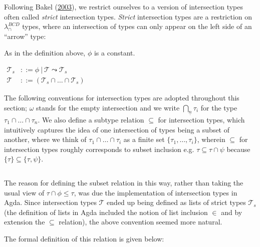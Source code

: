 \documentclass[a4paper, 12pt, twoside]{style/ociamthesis}
\theoremstyle{plain}
\theoremstyle{definition}
\newtheorem{Definition}{Definition}[chapter]
\theoremstyle{remark}
\newtheorem*{Remark}{Remark}
\newcommand{\taui}{\bigcap\nolimits_{\underline{n}} \tau_i}
\renewenvironment{Remark}{\begin{OldRemark}\begin{mdframed}[style=example, linecolor=black]}{\end{mdframed}\end{OldRemark}}
\renewenvironment{Definition}{\begin{OldDefinition}\begin{mdframed}[style=example, linecolor=cyan]}{\end{mdframed}\end{OldDefinition}}
\begin{document}
Following Bakel (\protect\hyperlink{ref-bakel}{2003}), we restrict
ourselves to a version of intersection types often called \emph{strict}
intersection types. \emph{Strict} intersection types are a restriction
on \(\lambda_\cap^{BCD}\) types, where an intersection of types can only
appear on the left side of an ``arrow'' type:

\begin{Definition}[Strict intersection types]

\label{Definition:itypes} As in the definition above, \(\phi\) is a
constant.

\begin{center}
$\begin{aligned}
\mathcal{T}_s &::= \phi\ |\ \mathcal{T} \leadsto \mathcal{T}_s \\ 
\mathcal{T} &::= (\mathcal{T}_s \cap\hdots\cap \mathcal{T}_s)
\end{aligned}$
\end{center}

\end{Definition}

The following conventions for intersection types are adopted throughout
this section; \(\omega\) stands for the empty intersection and we write
\(\taui\) for the type \(\tau_1 \cap\hdots\cap \tau_n\). We also define
a subtype relation \(\subseteq\) for intersection types, which
intuitively captures the idea of one intersection of types being a
subset of another, where we think of \(\tau_1 \cap \hdots \cap \tau_i\)
as a finite set \(\{\tau_1, \hdots , \tau_i\}\), wherein \(\subseteq\)
for intersection types roughly corresponds to subset inclusion e.g.
\(\tau \subseteq \tau \cap \psi\) because
\(\{\tau\} \subseteq \{\tau, \psi\}\).

\(\ \)

\begin{Remark}

The reason for defining the subset relation in this way, rather than
taking the usual view of \(\tau \cap \phi \leq \tau\), was due the
implementation of intersection types in Agda. Since intersection types
\(\mathcal{T}\) ended up being defined as lists of strict types
\(\mathcal{T}_s\) (the definition of lists in Agda included the notion
of list inclusion \(\in\) and by extension the \(\subseteq\) relation),
the above convention seemed more natural.

\end{Remark}

The formal definition of this relation is given below:
\end{document}
